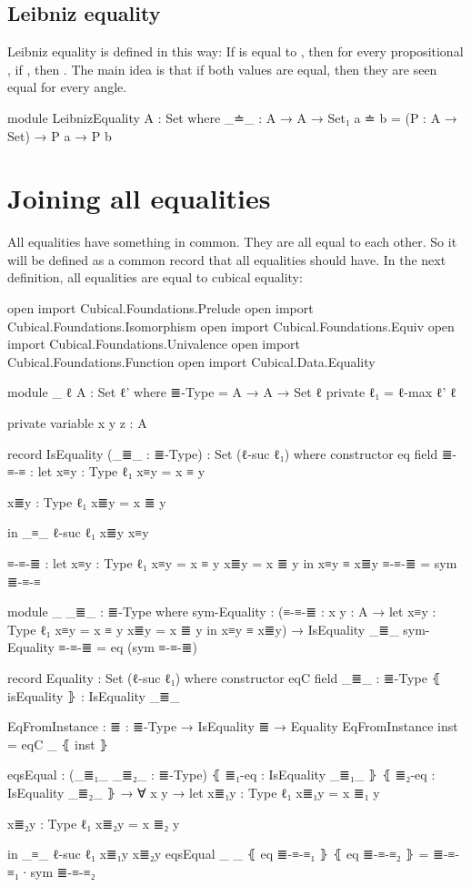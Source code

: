 \documentclass{article}
\begin{document}
\subsection{Leibniz equality}

Leibniz equality is defined in this way:
If  is equal to , then for every propositional , if ,
then .
The main idea is that if both values are equal, then they are seen equal for every angle.

\begin{code}
module LeibnizEquality {A : Set} where
  _≐_ : A → A → Set₁
  a ≐ b = (P : A → Set) → P a → P b
\end{code}

\section{Joining all equalities}

All equalities have something in common. They are all equal to each other.
So it will be defined as a common record that all equalities should have.
In the next definition, all equalities are equal to cubical equality:

\begin{code}

open import Cubical.Foundations.Prelude
open import Cubical.Foundations.Isomorphism
open import Cubical.Foundations.Equiv
open import Cubical.Foundations.Univalence
open import Cubical.Foundations.Function
open import Cubical.Data.Equality

module _ {ℓ} {A : Set ℓ'} where
  ≣-Type = A → A → Set ℓ
  private
    ℓ₁ = ℓ-max ℓ' ℓ

  private variable
    x y z : A

  record IsEquality (_≣_ : ≣-Type) : Set (ℓ-suc ℓ₁) where
    constructor eq
    field
      ≣-≡-≡ : let
        x≡y : Type ℓ₁
        x≡y = x ≡ y

        x≣y : Type ℓ₁
        x≣y = x ≣ y

        in _≡_ {ℓ-suc ℓ₁} x≣y x≡y

    ≡-≡-≣ : let
      x≡y : Type ℓ₁
      x≡y = x ≡ y
      x≣y = x ≣ y
      in x≡y ≡ x≣y
    ≡-≡-≣ = sym ≣-≡-≡

  module _ {_≣_ : ≣-Type} where
    sym-Equality : (≡-≡-≣ : {x y : A} → let
      x≡y : Type ℓ₁
      x≡y = x ≡ y
      x≣y = x ≣ y
      in x≡y ≡ x≣y)
      → IsEquality _≣_
    sym-Equality ≡-≡-≣ = eq (sym ≡-≡-≣)

  record Equality : Set (ℓ-suc ℓ₁) where
    constructor eqC
    field
      _≣_ : ≣-Type
      ⦃ isEquality ⦄ : IsEquality _≣_

  EqFromInstance : {≣ : ≣-Type} → IsEquality ≣ → Equality
  EqFromInstance inst = eqC _ ⦃ inst ⦄

  eqsEqual : (_≣₁_ _≣₂_ : ≣-Type)
    ⦃ ≣₁-eq : IsEquality _≣₁_ ⦄
    ⦃ ≣₂-eq : IsEquality _≣₂_ ⦄
    → ∀ {x y} → let
      x≣₁y : Type ℓ₁
      x≣₁y = x ≣₁ y

      x≣₂y : Type ℓ₁
      x≣₂y = x ≣₂ y

      in _≡_ {ℓ-suc ℓ₁} x≣₁y x≣₂y
  eqsEqual _ _ ⦃ eq ≣-≡-≡₁ ⦄ ⦃ eq ≣-≡-≡₂ ⦄ = ≣-≡-≡₁ ∙ sym ≣-≡-≡₂
\end{code}
\end{document}

